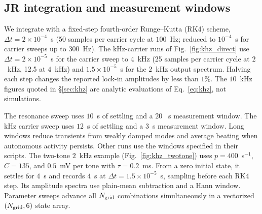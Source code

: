 \documentclass[11pt,a4paper]{article}
\providecommand{\DIFaddtex}[1]{{\protect\color{blue} \sf #1}} %
\providecommand{\DIFaddbegin}{} %
\providecommand{\DIFaddend}{} %
\providecommand{\DIFadd}[1]{\texorpdfstring{\DIFaddtex{#1}}{#1}} %
\begin{document}
\subsection{JR integration and measurement windows}\label{supp:jr-runs}
We integrate with a fixed-step fourth-order Runge--Kutta (RK4) scheme,
$\Delta t=2\times10^{-4}$~s (50 samples per carrier cycle at $100$~Hz; reduced to
$10^{-4}$~s for carrier sweeps up to $300$~Hz). The kHz-carrier runs of
Fig.~\ref{fig:khz_direct} use $\Delta t=2\times10^{-5}$~s for the carrier sweep to
$4$~kHz (25 samples per carrier cycle at $2$~kHz, 12.5 at $4$~kHz) and
$1.5\times10^{-5}$~s for the $2$~kHz output spectrum. Halving each step changes the
reported lock-in amplitudes by less than $1\%$. The $10$~kHz figures quoted in
\S\ref{sec:khz} are analytic evaluations of Eq.~\eqref{eq:khz}, not simulations.

The resonance sweep uses $10$~s of settling and a $20$\DIFaddbegin \DIFadd{~s
measurement window. The kHz carrier sweep uses $12$~s of settling and
a $3$}\DIFaddend ~s measurement window. Long windows reduce transients from weakly damped modes and
average beating when autonomous activity persists. Other runs use the windows
specified in their scripts.
The two-tone $2$~kHz example (Fig.~\ref{fig:khz_twotone}) uses $p=400$~s$^{-1}$,
$C=135$, and $0.5$~mV per tone with $\tau=0.2$~ms. From a zero initial state,
it settles for $4$~s and records $4$~s at $\Delta t=1.5\times10^{-5}$~s,
sampling before each RK4 step. Its amplitude spectra use plain-mean subtraction
and a Hann window. Parameter sweeps advance all $N_{\rm grid}$ combinations simultaneously
in a vectorized $(N_{\rm grid},6)$ state array.

\fi
\end{document}
